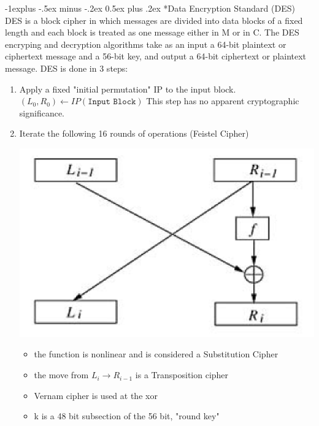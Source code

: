 \documentclass[3pt,landscape]{article}
\makeatletter
\renewcommand{\subsection}{\@startsection{subsection}{2}{0mm}%
                            {-1explus -.5ex minus -.2ex}%
                            {0.5ex plus .2ex}%
                            {\normalfont\normalsize\bfseries}}
\makeatother
\begin{document}
\begin{multicols}{3}
\subsection*{Data Encryption Standard (DES)}
DES is a block cipher in which messages are divided into data blocks of a fixed length and each block is treated as one message either in M or in C. The DES encryping and decryption algorithms take as an input a 64-bit plaintext or ciphertext message and a 56-bit key, and output a 64-bit ciphertext or plaintext message.
DES is done in 3 steps:
\begin{enumerate}
    \item Apply a fixed "initial permutation" IP to the input block.
        \((L_0,R_0) \leftarrow IP(\texttt{Input Block})\) 
        This step has no apparent cryptographic significance.
    \item Iterate the following 16 rounds of operations (Feistel Cipher)\\
        \begin{center}
        \includegraphics[scale=.47]{feistel}
        \end{center}
        \begin{itemize}
            \item the function is nonlinear and is considered a Substitution Cipher
            \item the move from \(L_{i} \rightarrow R_{i-1}\) is a Transposition cipher
            \item Vernam cipher is used at the xor
            \item k is a 48 bit subsection of the 56 bit, "round key"
        \end{itemize}
\end{enumerate}


\end{multicols}
\end{document}
